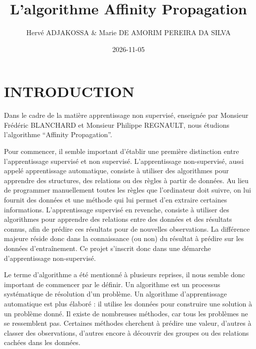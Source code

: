 \documentclass[11pt,a4paper]{memoirerecherche}
\title{L'algorithme Affinity Propagation}
\author{Hervé ADJAKOSSA \& Marie DE AMORIM PEREIRA DA SILVA}
\date{2026-11-05}
\begin{document}
\maketitle
\newpage

{
\setcounter{tocdepth}{3}
\tableofcontents
\newpage
}



\newpage

\section{INTRODUCTION}\label{introduction}

Dans le cadre de la matière apprentissage non supervisé, enseignée par
Monsieur Frédéric BLANCHARD et Monsieur Philippe REGNAULT, nous étudions
l'algorithme ``Affinity Propagation''.

Pour commencer, il semble important d'établir une première distinction
entre l'apprentissage supervisé et non supervisé. L'apprentissage
non-supervisé, aussi appelé apprentissage automatique, consiste à
utiliser des algorithmes pour apprendre des structures, des relations ou
des règles à partir de données. Au lieu de programmer manuellement
toutes les règles que l'ordinateur doit suivre, on lui fournit des
données et une méthode qui lui permet d'en extraire certaines
informations. L'apprentissage supervisé en revenche, consiste à utiliser
des algorithmes pour apprendre des relations entre des données et des
résultats connus, afin de prédire ces résultats pour de nouvelles
observations. La différence majeure réside donc dans la connaissance (ou
non) du résultat à prédire sur les données d'entraînement. Ce projet
s'inscrit donc dans une démarche d'apprentissage non-supervisé.

Le terme d'algorithme a été mentionné à plusieurs reprises, il nous
semble donc important de commencer par le définir. Un algorithme est un
processus systématique de résolution d'un problème. Un algorithme
d'apprentissage automatique est plus élaboré : il utilise les données
pour construire une solution à un problème donné. Il existe de
nombreuses méthodes, car tous les problèmes ne se ressemblent pas.
Certaines méthodes cherchent à prédire une valeur, d'autres à classer
des observations, d'autres encore à découvrir des groupes ou des
relations cachées dans les données.
\end{document}
